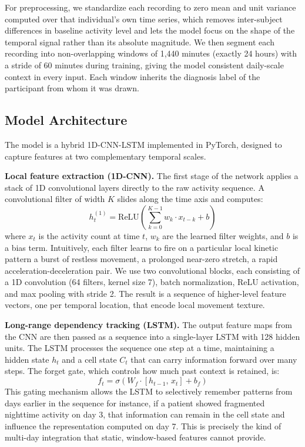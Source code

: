 For preprocessing, we standardize each recording to zero mean and unit variance computed over that individual's own time series, which removes inter-subject differences in baseline activity level and lets the model focus on the shape of the temporal signal rather than its absolute magnitude. We then segment each recording into non-overlapping windows of 1,440 minutes (exactly 24 hours) with a stride of 60 minutes during training, giving the model consistent daily-scale context in every input. Each window inherits the diagnosis label of the participant from whom it was drawn.

\subsection{Model Architecture}

The model is a hybrid 1D-CNN-LSTM implemented in PyTorch, designed to capture features at two complementary temporal scales.

\textbf{Local feature extraction (1D-CNN).}
The first stage of the network applies a stack of 1D convolutional layers directly to the raw activity sequence. A convolutional filter of width $K$ slides along the time axis and computes:
\begin{equation}
    h_t^{(1)} = \text{ReLU}\!\left(\sum_{k=0}^{K-1} w_k \cdot x_{t-k} + b\right)
\end{equation}
where $x_t$ is the activity count at time $t$, $w_k$ are the learned filter weights, and $b$ is a bias term. Intuitively, each filter learns to fire on a particular local kinetic pattern a burst of restless movement, a prolonged near-zero stretch, a rapid acceleration-deceleration pair. We use two convolutional blocks, each consisting of a 1D convolution (64 filters, kernel size 7), batch normalization, ReLU activation, and max pooling with stride 2. The result is a sequence of higher-level feature vectors, one per temporal location, that encode local movement texture.

\textbf{Long-range dependency tracking (LSTM).}
The output feature maps from the CNN are then passed as a sequence into a single-layer LSTM with 128 hidden units. The LSTM processes the sequence one step at a time, maintaining a hidden state $h_t$ and a cell state $C_t$ that can carry information forward over many steps. The forget gate, which controls how much past context is retained, is:
\begin{equation}
    f_t = \sigma\!\left(W_f \cdot [h_{t-1},\, x_t] + b_f\right)
\end{equation}
This gating mechanism allows the LSTM to selectively remember patterns from days earlier in the sequence for instance, if a patient showed fragmented nighttime activity on day 3, that information can remain in the cell state and influence the representation computed on day 7. This is precisely the kind of multi-day integration that static, window-based features cannot provide.

